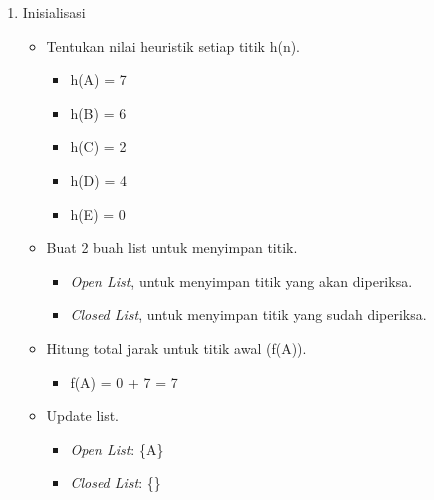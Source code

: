 \begin{enumerate}
    \item Inisialisasi
    \begin{itemize}
        \item Tentukan nilai heuristik setiap titik h(n).
        \begin{itemize}
            \item h(A) = 7
            \item h(B) = 6
            \item h(C) = 2
            \item h(D) = 4
            \item h(E) = 0 
        \end{itemize}
        \item Buat 2 buah list untuk menyimpan titik.
        \begin{itemize}
            \item \textit{Open List}, untuk menyimpan titik yang akan diperiksa.
            \item \textit{Closed List}, untuk menyimpan titik yang sudah diperiksa.
        \end{itemize}
        \item Hitung total jarak untuk titik awal (f(A)).
        \begin{itemize}
            \item f(A) = 0 + 7 = 7
        \end{itemize}
        \item Update list.
        \begin{itemize}
            \item \textit{Open List}: \{A\}
            \item \textit{Closed List}: \{\}
        \end{itemize}
    \end{itemize}


\end{enumerate}
